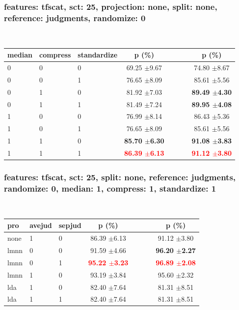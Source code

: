 \begin{frame}\frametitle{features: tfscat, sct: 25, projection: none, split: none, reference: judgments, randomize: 0} 
  
\begin{table} 
\begin{center} 
\ 
 \setlength{\tabcolsep}{.16667em} 
\begin{tabular}{lllccccc} 
median & compress & standardize & p (\%) &  &  &  & p (\%) \\ 
\hline 
0 & 0 & 0 & 69.25 $\pm$9.67 &  &  &  & 74.80 $\pm$8.67 \\ 
0 & 0 & 1 & 76.65 $\pm$8.09 &  &  &  & 85.61 $\pm$5.56 \\ 
0 & 1 & 0 & 81.92 $\pm$7.03 &  &  &  & \textbf{89.49 $\pm$4.30} \\ 
0 & 1 & 1 & 81.49 $\pm$7.24 &  &  &  & \textbf{89.95 $\pm$4.08} \\ 
1 & 0 & 0 & 76.99 $\pm$8.14 &  &  &  & 86.43 $\pm$5.36 \\ 
1 & 0 & 1 & 76.65 $\pm$8.09 &  &  &  & 85.61 $\pm$5.56 \\ 
1 & 1 & 0 & \textbf{85.70 $\pm$6.30} &  &  &  & \textbf{91.08 $\pm$3.83} \\ 
1 & 1 & 1 & \textbf{\textcolor{red}{86.39 $\pm$6.13}} &  &  &  & \textbf{\textcolor{red}{91.12 $\pm$3.80}} \\ 
\end{tabular} 
\end{center} 
\label{fetfSc25PrnoSpnoRejuRa0} 
\end{table} 
 
\end{frame}  
\begin{frame}\frametitle{features: tfscat, sct: 25, split: none, reference: judgments, randomize: 0, median: 1, compress: 1, standardize: 1} 
  
\begin{table} 
\begin{center} 
\ 
 \setlength{\tabcolsep}{.16667em} 
\begin{tabular}{lllccccc} 
pro & avejud & sepjud & p (\%) &  &  &  & p (\%) \\ 
\hline 
none & 1 & 0 & 86.39 $\pm$6.13 &  &  &  & 91.12 $\pm$3.80 \\ 
lmnn & 0 & 0 & 91.59 $\pm$4.66 &  &  &  & \textbf{96.20 $\pm$2.27} \\ 
lmnn & 0 & 1 & \textbf{\textcolor{red}{95.22 $\pm$3.23}} &  &  &  & \textbf{\textcolor{red}{96.89 $\pm$2.08}} \\ 
lmnn & 1 & 0 & 93.19 $\pm$3.84 &  &  &  & 95.60 $\pm$2.32 \\ 
lda & 1 & 0 & 82.40 $\pm$7.64 &  &  &  & 81.31 $\pm$8.51 \\ 
lda & 1 & 1 & 82.40 $\pm$7.64 &  &  &  & 81.31 $\pm$8.51 \\ 
\end{tabular} 
\end{center} 
\label{fetfSc25SpnoRejuRa0Me1Co1St1} 
\end{table} 
 
\end{frame}  

